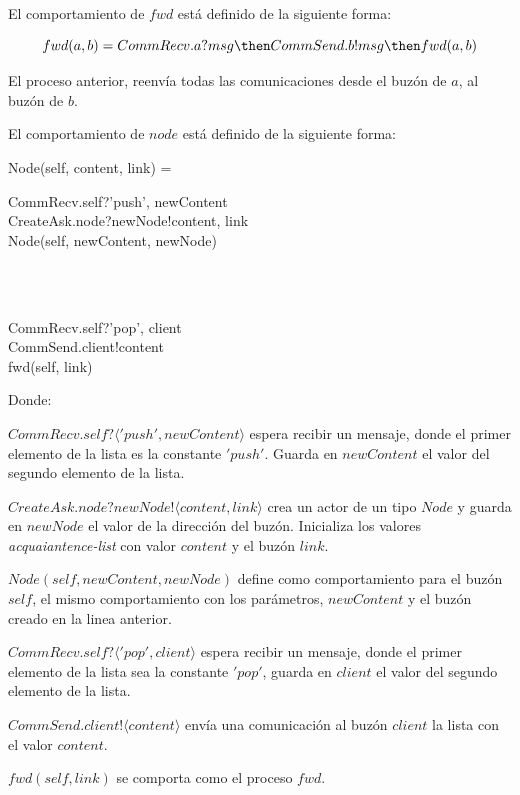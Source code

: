 El comportamiento de $fwd$ está definido de la siguiente forma:

\[
  fwd(a, b) = CommRecv.a?msg \then CommSend.b!msg \then fwd(a, b)
\]

El proceso anterior, reenvía todas las comunicaciones desde el buzón de $a$, al buzón de $b$.

El comportamiento de $node$ está definido de la siguiente forma:

\begin{process}
Node(self, content, link) = {} \\ \quad
\begin{block}
CommRecv.self?\langle 'push', newContent \rangle \then \\
CreateAsk.node?newNode!\langle content, link \rangle \then \\
Node(self, newContent, newNode)
\end{block} \\
\Extchoice \\ \quad
\begin{block}
CommRecv.self?\langle 'pop', client \rangle \then  \\
CommSend.client!\langle content \rangle \then  \\
fwd(self, link)
\end{block}

\end{process}

Donde:

\begin{description}
 \item $CommRecv.self?\langle 'push', newContent \rangle$ espera recibir un mensaje, donde el primer elemento de la lista es la constante $'push'$. Guarda en $newContent$ el valor del segundo elemento de la lista.
 \item $CreateAsk.node?newNode!\langle content, link \rangle$ crea un actor de un tipo $Node$ y guarda en $newNode$ el valor de la dirección del buzón. Inicializa los valores \textit{acquaiantence-list} con valor $content$ y el buzón $link$.
 \item $Node(self, newContent, newNode)$ define como comportamiento para el buzón $self$, el mismo comportamiento con los parámetros, $newContent$ y el buzón creado en la linea anterior.
 \item $CommRecv.self?\langle 'pop', client \rangle$ espera recibir un mensaje, donde el primer elemento de la lista sea la constante $'pop'$, guarda en $client$ el valor del segundo elemento de la lista.
 \item $CommSend.client!\langle content \rangle$ envía una comunicación al buzón $client$ la lista con el valor $content$.
 \item $fwd(self, link)$ se comporta como el proceso $fwd$.
\end{description}

